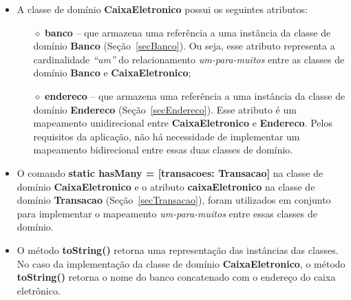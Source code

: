 \begin{itemize}

\item A classe de domínio {\bf CaixaEletronico} possui os seguintes atributos: 

\vspace{0.5cm}

\begin{itemize}

\item[$\diamond$] {\bf banco} -- que  armazena uma referência a uma instância da
  classe de domínio {\bf  Banco} (Seção~\ref{secBanco}).  Ou seja, esse atributo
  representa a cardinalidade {\em ``um''} do relacionamento {\em um-para-muitos}
  entre as classes de domínio {\bf Banco} e {\bf CaixaEletronico};

\vspace{0.5cm}

\item[$\diamond$] {\bf endereco} -- que  armazena uma referência a uma instância
  da classe de domínio  {\bf Endereco} (Seção~\ref{secEndereco}).  Esse atributo
  é um  mapeamento unidirecional entre  {\bf CaixaEletronico} e  {\bf Endereco}.
  Pelos requisitos da aplicação, não há necessidade de implementar um mapeamento
  bidirecional entre essas duas classes de domínio.

\end{itemize}

\vspace{0.5cm}

\item  O comando {\bf  static hasMany  = [transacoes:  Transacao]} na  classe de
  domínio {\bf CaixaEletronico} e o  atributo {\bf caixaEletronico} na classe de
  domínio  {\bf  Transacao}   (Seção~\ref{secTransacao}),  foram  utilizados  em
  conjunto  para  implementar  o  mapeamento {\em  um-para-muitos}  entre  essas
  classes de domínio.

\vspace{0.5cm}

\item O  método {\bf  toString()} retorna uma  representação das  instâncias das
  classes.  No caso da implementação da classe de domínio {\bf CaixaEletronico},
  o método {\bf  toString()} retorna o nome do banco  concatenado com o endereço
  do caixa eletrônico.

\end{itemize}

\newpage

